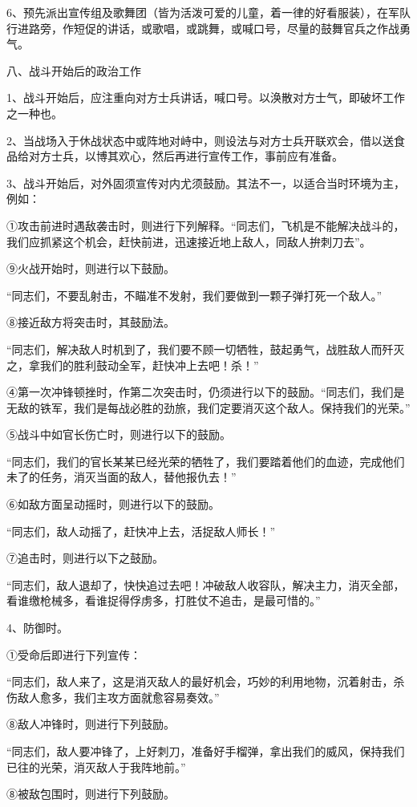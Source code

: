 6、预先派出宣传组及歌舞团（皆为活泼可爱的儿童，着一律的好看服装），在军队行进路旁，作短促的讲话，或歌唱，或跳舞，或喊口号，尽量的鼓舞官兵之作战勇气。

八、战斗开始后的政治工作

1、战斗开始后，应注重向对方士兵讲话，喊口号。以涣散对方士气，即破坏工作之一种也。

2、当战场入于休战状态中或阵地对峙中，则设法与对方士兵开联欢会，借以送食品给对方士兵，以博其欢心，然后再进行宣传工作，事前应有准备。

3、战斗开始后，对外固须宣传对内尤须鼓励。其法不一，以适合当时环境为主，例如：

①攻击前进时遇敌袭击时，则进行下列解释。“同志们，飞机是不能解决战斗的，我们应抓紧这个机会，赶快前进，迅速接近地上敌人，同敌人拚刺刀去”。

⑨火战开始时，则进行以下鼓励。

“同志们，不要乱射击，不瞄准不发射，我们要做到一颗子弹打死一个敌人。”

⑧接近敌方将突击时，其鼓励法。

“同志们，解决敌人时机到了，我们要不顾一切牺牲，鼓起勇气，战胜敌人而歼灭之，拿我们的胜利鼓动全军，赶快冲上去吧！杀！”

④第一次冲锋顿挫时，作第二次突击时，仍须进行以下的鼓励。“同志们，我们是无敌的铁军，我们是每战必胜的劲旅，我们定要消灭这个敌人。保持我们的光荣。”

⑤战斗中如官长伤亡时，则进行以下的鼓励。

“同志们，我们的官长某某已经光荣的牺牲了，我们要踏着他们的血迹，完成他们未了的任务，消灭当面的敌人，替他报仇去！”

⑥如敌方面呈动摇时，则进行以下的鼓励。

“同志们，敌人动摇了，赶快冲上去，活捉敌人师长！”

⑦追击时，则进行以下之鼓励。

“同志们，敌人退却了，快快追过去吧！冲破敌人收容队，解决主力，消灭全部，看谁缴枪械多，看谁捉得俘虏多，打胜仗不追击，是最可惜的。”

4、防御时。

①受命后即进行下列宣传：

“同志们，敌人来了，这是消灭敌人的最好机会，巧妙的利用地物，沉着射击，杀伤敌人愈多，我们主攻方面就愈容易奏效。”

⑧敌人冲锋时，则进行下列鼓励。

“同志们，敌人要冲锋了，上好刺刀，准备好手榴弹，拿出我们的威风，保持我们已往的光荣，消灭敌人于我阵地前。”

⑧被敌包围时，则进行下列鼓励。

